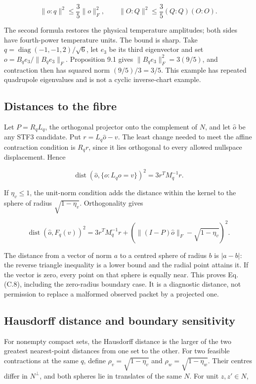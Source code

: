 \documentclass[
  11pt,
  a4paper]{article}
\begin{document}
\[
\|o:q\|^2\le\frac35\|o\|_F^2,
\qquad
\boxed{\|O:Q\|^2\le\frac35(Q:Q)(O:O)}.
\tag{C.6}
\]

The second formula restores the physical temperature amplitudes; both sides have fourth-power temperature units. The bound is sharp. Take \(q=\operatorname{diag}(-1,-1,2)/\sqrt6\), let \(e_3\) be its third eigenvector and set \(o=B_qe_3/\|B_qe_3\|_F\). Proposition 9.1 gives \(\|B_qe_3\|_F^2=3(9/5)\), and contraction then has squared norm \((9/5)/3=3/5\). This example has repeated quadrupole eigenvalues and is not a cyclic inverse-chart example.

\hypertarget{c.4-distances-to-the-fibre}{%
\subsection{Distances to the fibre}\label{c.4-distances-to-the-fibre}}

Let \(P=R_qL_q\), the orthogonal projector onto the complement of \(N\), and let \(\widehat o\) be any STF3 candidate. Put \(r=L_q\widehat o-v\). The least change needed to meet the affine contraction condition is \(R_qr\), since it lies orthogonal to every allowed nullspace displacement. Hence

\[
\operatorname{dist}(\widehat o,\{o:L_qo=v\})^2
=3r^TM_q^{-1}r.
\tag{C.7}
\]

If \(\eta_v\le1\), the unit-norm condition adds the distance within the kernel to the sphere of radius \(\sqrt{1-\eta_v}\). Orthogonality gives

\[
\operatorname{dist}(\widehat o,F_q(v))^2
=3r^TM_q^{-1}r+
\left(\|(I-P)\widehat o\|_F-\sqrt{1-\eta_v}\right)^2.
\tag{C.8}
\]

The distance from a vector of norm \(a\) to a centred sphere of radius \(b\) is \(|a-b|\): the reverse triangle inequality is a lower bound and the radial point attains it. If the vector is zero, every point on that sphere is equally near. This proves Eq. (C.8), including the zero-radius boundary case. It is a diagnostic distance, not permission to replace a malformed observed packet by a projected one.

\hypertarget{c.5-hausdorff-distance-and-boundary-sensitivity}{%
\subsection{Hausdorff distance and boundary sensitivity}\label{c.5-hausdorff-distance-and-boundary-sensitivity}}

For nonempty compact sets, the Hausdorff distance is the larger of the two greatest nearest-point distances from one set to the other. For two feasible contractions at the same \(q\), define \(\rho_v=\sqrt{1-\eta_v}\) and \(\rho_w=\sqrt{1-\eta_w}\). Their centres differ in \(N^\perp\), and both spheres lie in translates of the same \(N\). For unit \(z,z'\in N\),
\end{document}
